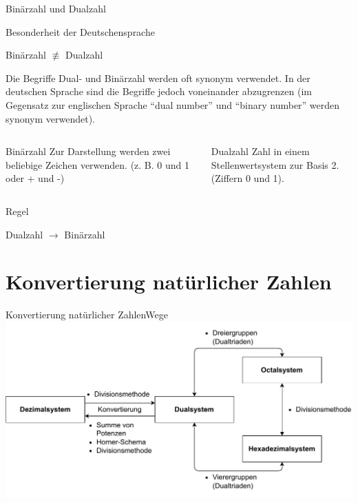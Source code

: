 \documentclass[xelatex,aspectratio=169]{beamer}
\begin{document}
\begin{frame}{Binärzahl und Dualzahl}
  \begin{alertblock}{Besonderheit der Deutschensprache}
    \begin{center}
      Binärzahl $\not\equiv$ Dualzahl
    \end{center}

    Die Begriffe Dual- und Binärzahl werden oft synonym verwendet. In der deutschen Sprache  sind die Begriffe jedoch voneinander abzugrenzen (im Gegensatz zur englischen Sprache \enquote{dual number} und \enquote{binary number} werden synonym verwendet).
  \end{alertblock}
  \begin{columns}[onlytextwidth]
    \begin{column}{0.48\textwidth}
      \begin{block}{Binärzahl}
        Zur Darstellung werden zwei beliebige Zeichen verwenden. (z. B. 0 und 1 oder + und -)
      \end{block}
    \end{column}
    \begin{column}{0.48\textwidth}
      \begin{block}{Dualzahl}
        Zahl in einem Stellenwertsystem zur Basis 2. (Ziffern 0 und 1).
      \end{block}
    \end{column}
  \end{columns}
  \begin{block}{Regel}
    \begin{center}
      Dualzahl $\rightarrow$ Binärzahl
    \end{center}
  \end{block}
\end{frame}

\section{Konvertierung natürlicher Zahlen}

\begin{frame}{Konvertierung natürlicher Zahlen}{Wege}
  \includegraphics[width=\textwidth]{fig/zahlensysteme_umwandlung.pdf}
\end{frame}
\end{document}
